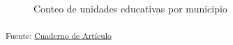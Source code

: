 \documentclass[
  12pt]{article}
\begin{document}
\begin{figure}[H]


\caption{\label{fig-mun2024}Conteo de unidades educativas por municipio}

\end{figure}%

\textsubscript{Fuente: \href{sociest.org/index.ipynb.html}{Cuaderno de
Artículo}}
\end{document}
